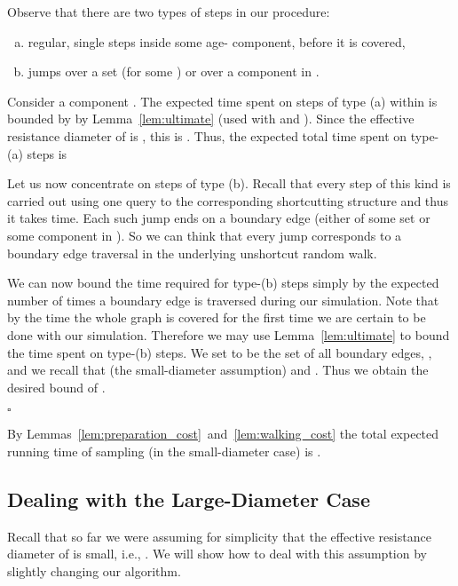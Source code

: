 \documentclass[11pt, letterpaper]{article}
\newenvironment{proof}{\noindent{\bf Proof:}\hspace*{1em}}{\qed\bigskip}
\newcommand{\qed}{\hfill\ensuremath{\square}}
\begin{document}
\begin{proof}
Observe that there are two types of steps in our procedure:
\begin{enumerate}[(a)]
\item regular, single steps inside some age- component, before it is covered,
\item jumps over a  set (for some ) or over a component in .
\end{enumerate}
Consider a component . The expected time spent on steps of type (a) within  is bounded by  by Lemma~\ref{lem:ultimate} (used with  and ). Since the effective resistance diameter of  is , this is . Thus, the expected total time spent on type-(a) steps is 


Let us now concentrate on steps of type (b). Recall that every step of this kind is carried out using one query to the corresponding shortcutting structure and thus it takes  time. Each such jump ends on a boundary edge (either of some  set or some component in ). So we can think that every jump corresponds to a boundary edge traversal in the underlying unshortcut random walk.

 We can now bound the time required for type-(b) steps simply by the expected number of times a boundary edge is traversed during our simulation. Note that by the time the whole graph is covered for the first time we are certain to be done with our simulation. Therefore we may use Lemma~\ref{lem:ultimate} to bound the time spent on type-(b) steps. We set  to be the set of all boundary edges, , and we recall that  (the small-diameter assumption) and . Thus we obtain the desired bound of . 

\end{proof}

By Lemmas~\ref{lem:preparation_cost}~and~\ref{lem:walking_cost} the total expected running time of sampling (in the small-diameter case) is .

\subsection{Dealing with the Large-Diameter Case}\label{sec:deadling_with_large_diameter_case}

Recall that so far we were assuming for simplicity that the effective resistance diameter of  is small, i.e.,  . We will show how to deal with this assumption by slightly changing our algorithm. 
\end{document}
